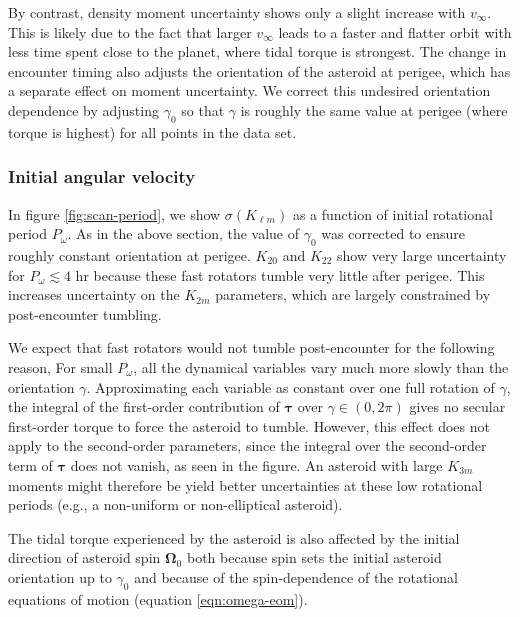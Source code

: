 \documentclass[fleqn,usenatbib]{mnras}
\begin{document}
By contrast, density moment uncertainty shows only a slight increase with $v_\infty$. This is likely due to the fact that larger $v_\infty$ leads to a faster and flatter orbit with less time spent close to the planet, where tidal torque is strongest. The change in encounter timing also adjusts the orientation of the asteroid at perigee, which has a separate effect on moment uncertainty. We correct this undesired orientation dependence by adjusting $\gamma_0$ so that $\gamma$ is roughly the same value at perigee (where torque is highest) for all points in the data set.

\subsubsection{Initial angular velocity}
\label{sec:scan-period}

In figure \ref{fig:scan-period}, we show $\sigma(K_{\ell m})$ as a function of initial rotational period $P_\omega$. As in the above section, the value of $\gamma_0$ was corrected to ensure roughly constant orientation at perigee. $K_{20}$ and $K_{22}$ show very large uncertainty for $P_\omega \lesssim 4$ hr because these fast rotators tumble very little after perigee. This increases uncertainty on the $K_{2m}$ parameters, which are largely constrained by post-encounter tumbling.

We expect that fast rotators would not tumble post-encounter for the following reason, For small $P_\omega$, all the dynamical variables vary much more slowly than the orientation $\gamma$. Approximating each variable as constant over one full rotation of $\gamma$, the integral of the first-order contribution of $\bm \tau$ over $\gamma \in (0, 2\pi)$ gives no secular first-order torque to force the asteroid to tumble. However, this effect does not apply to the second-order parameters, since the integral over the second-order term of $\bm \tau$ does not vanish, as seen in the figure. An asteroid with large $K_{3m}$ moments might therefore be yield better uncertainties at these low rotational periods (e.g., a non-uniform or non-elliptical asteroid).

The tidal torque experienced by the asteroid is also affected by the initial direction of asteroid spin $\bm \Omega_0$ both because spin sets the initial asteroid orientation up to $\gamma_0$ and because of the spin-dependence of the rotational equations of motion (equation \ref{eqn:omega-eom}).
\end{document}
